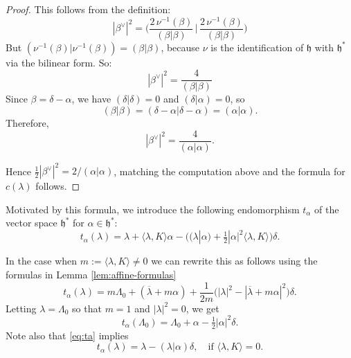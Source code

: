 \documentclass[12pt]{article}
\begin{document}
\begin{proof}
This follows from the definition:
\[
    |\beta^\vee|^2 = \Big(\frac{2\,\nu^{-1}(\beta)}{(\beta|\beta)} \,\Big|\, \frac{2\,\nu^{-1}(\beta)}{(\beta|\beta)}\Big)
\]
But $(\nu^{-1}(\beta)|\nu^{-1}(\beta)) = (\beta|\beta)$, because $\nu$ is the identification of $\mathfrak{h}$ with $\mathfrak{h}^*$ via the bilinear form. So:
\[
    |\beta^\vee|^2 = \frac{4}{(\beta|\beta)}
\]
Since $\beta = \delta - \alpha$, we have $(\delta|\delta)=0$ and $(\delta|\alpha)=0$, so
\[
(\beta|\beta) = (\delta-\alpha|\delta-\alpha) = (\alpha|\alpha).
\]
Therefore,
\[
|\beta^\vee|^2 = \frac{4}{(\alpha|\alpha)}.
\]

Hence $\frac{1}{2}|\beta^\vee|^2=2/(\alpha|\alpha)$, matching the computation above and the formula for $c(\lambda)$ follows.
\end{proof}

Motivated by this formula, we introduce the following endomorphism 
$t_\alpha$ of the vector space $\mathfrak{h}^*$ for $\alpha \in \mathfrak{h}^*$:
\begin{equation}\label{eq:ta}
    t_\alpha(\lambda) 
    = \lambda + \langle \lambda, K \rangle \alpha 
      - \big( (\lambda|\alpha)
      + \tfrac{1}{2}|\alpha|^2 \langle \lambda, K \rangle \big)\delta.
\end{equation}

In the case when $m := \langle \lambda, K\rangle \neq 0$ we can rewrite this 
as follows using the formulas in Lemma \ref{lem:affine-formulas}
\begin{equation}
    t_\alpha(\lambda) 
    = m \Lambda_0 + (\overline{\lambda} + m \alpha) 
      + \frac{1}{2m}\big(|\lambda|^2 - |\overline{\lambda} + m\alpha|^2\big)\delta.
\end{equation}
Letting $\lambda = \Lambda_0$ so that $m=1$ and $|\lambda|^2=0$, we get
\begin{equation}
    t_\alpha(\Lambda_0) = \Lambda_0 + \alpha - \tfrac{1}{2}|\alpha|^2 \delta.
\end{equation}
Note also that \eqref{eq:ta} implies
\begin{equation}
    t_\alpha(\lambda) = \lambda - (\lambda|\alpha)\delta, 
    \quad \text{if } \langle \lambda, K\rangle = 0.
\end{equation}
\end{document}
